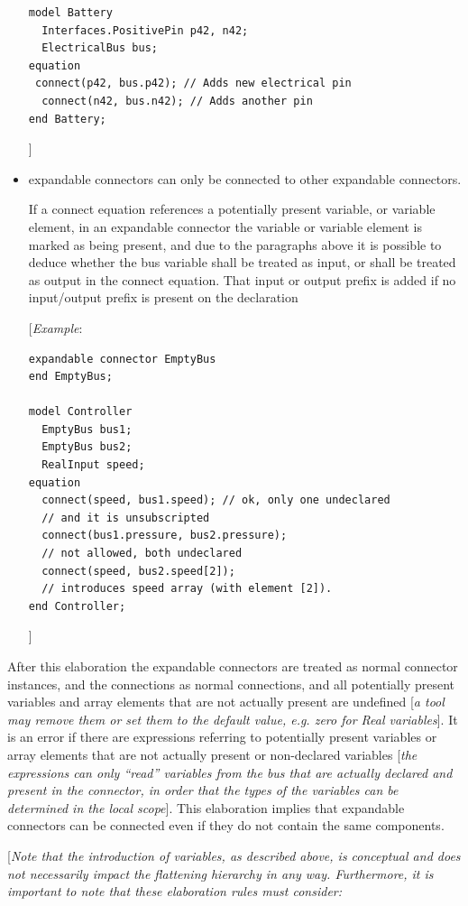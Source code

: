 \documentclass[10pt,a4paper]{report}
\begin{document}
\begin{itemize}
\begin{lstlisting}[language=modelica]
model Battery
  Interfaces.PositivePin p42, n42;
  ElectricalBus bus;
equation
 connect(p42, bus.p42); // Adds new electrical pin
  connect(n42, bus.n42); // Adds another pin
end Battery;
\end{lstlisting}

{]}

\item
  expandable connectors can only be connected to other expandable
  connectors.

  If a connect equation references a potentially present variable, or
  variable element, in an expandable connector the variable or variable
  element is marked as being present, and due to the paragraphs above it
  is possible to deduce whether the bus variable shall be treated as
  input, or shall be treated as output in the connect equation. That
  input or output prefix is added if no input/output prefix is present
  on the declaration

{[}\emph{Example}:
\begin{lstlisting}[language=modelica]
expandable connector EmptyBus
end EmptyBus;

model Controller
  EmptyBus bus1;
  EmptyBus bus2;
  RealInput speed;
equation
  connect(speed, bus1.speed); // ok, only one undeclared
  // and it is unsubscripted
  connect(bus1.pressure, bus2.pressure);
  // not allowed, both undeclared
  connect(speed, bus2.speed[2]);
  // introduces speed array (with element [2]).
end Controller;
\end{lstlisting}
{]}
\end{itemize}

After this elaboration the expandable connectors are treated as normal
connector instances, and the connections as normal connections, and all
potentially present variables and array elements that are not actually
present are undefined {[}\emph{a tool may remove them or set them to the
default value, e.g. zero for Real variables}{]}. It is an error if there
are expressions referring to potentially present variables or array
elements that are not actually present or non-declared variables
{[}\emph{the expressions can only ``read'' variables from the bus that
are actually declared and present in the connector, in order that the
types of the variables can be determined in the local scope}{]}. This
elaboration implies that expandable connectors can be connected even if
they do not contain the same components.

{[}\emph{Note that the introduction of variables, as described above, is
conceptual and does not necessarily impact the flattening hierarchy in
any way. Furthermore, it is important to note that these elaboration
rules must consider:}
\end{document}
